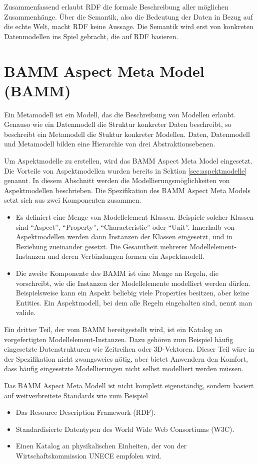 Zusammenfassend erlaubt RDF die formale Beschreibung aller möglichen Zusammenhänge. Über die Semantik, also die Bedeutung der Daten in Bezug auf die echte Welt, macht RDF keine Aussage. Die Semantik wird erst von konkreten Datenmodellen  ins Spiel gebracht, die auf RDF basieren.

\section{BAMM Aspect Meta Model (BAMM)}

Ein Metamodell ist ein Modell, das die Beschreibung von Modellen erlaubt. \cite[vgl.][S. 43f]{jeusfeld2009metamodel} Genauso wie ein Datenmodell die Struktur konkreter Daten beschreibt, so beschreibt ein Metamodell die Stuktur konkreter Modellen. Daten, Datenmodell und Metamodell bilden eine Hierarchie von drei Abstraktionsebenen.

Um Aspektmodelle zu erstellen, wird das BAMM Aspect Meta Model eingesetzt. Die Vorteile von Aspektmodellen wurden bereits in Sektion \ref{sec:aspektmodelle} genannt. In diesem Abschnitt werden die Modellierungsmöglichkeiten von Aspektmodellen beschrieben. Die Spezifikation des BAMM Aspect Meta Models setzt sich aus zwei Komponenten zusammen.
\begin{itemize}
	\item Es definiert eine Menge von Modellelement-Klassen. Beispiele solcher Klassen sind "`Aspect"', "`Property"', "`Characteristic"' oder "`Unit"'. Innerhalb von Aspektmodellen werden dann Instanzen der Klassen eingesetzt, und in Beziehung zueinander gesetzt. Die Gesamtheit mehrerer Modellelement-Instanzen und deren Verbindungen formen ein Aspektmodell.
	\item Die zweite Komponente des BAMM ist eine Menge an Regeln, die vorschreibt, wie die Instanzen der Modellelemente modelliert werden dürfen. Beispielsweise kann ein Aspekt beliebig viele Properties besitzen, aber keine Entities. Ein Aspektmodell, bei dem alle Regeln eingehalten sind, nennt man valide.
\end{itemize}

Ein dritter Teil, der vom BAMM bereitgestellt wird, ist ein Katalog an vorgefertigten Modellelement-Instanzen. Dazu gehören zum Beispiel häufig eingesetzte Datenstrukturen wie Zeitreihen oder 3D-Vektoren. Dieser Teil wäre in der Spezifikation nicht zwangsweies nötig, aber bietet Anwendern den Komfort, dass häufig eingesetzte Modellierungen nicht selbst modelliert werden müssen.

Das BAMM Aspect Meta Modell ist nicht komplett eigenständig, sondern basiert auf weitverbreitete Standards wie zum Beispiel
\begin{itemize}
	\item Das Resource Description Framework (RDF). \cite[vgl.][]{w3c2014rdf}
	\item Standardisierte Datentypen des World Wide Web Consortiums (W3C). \cite[vgl.][]{w3c2004datatypes}
	\item Einen Katalog an physikalischen Einheiten, der von der Wirtschaftskommission UNECE empfolen wird. \cite[vgl.][]{unece2021units}
\end{itemize}


